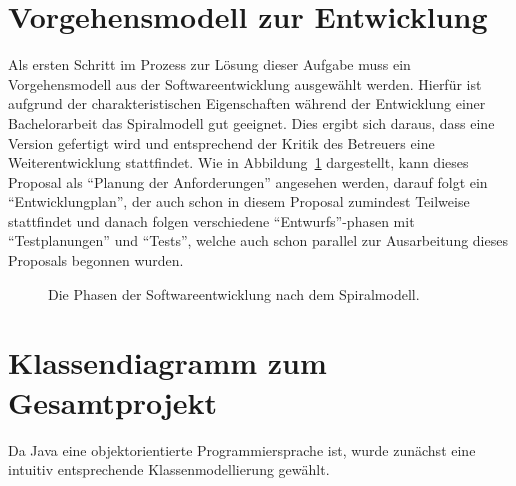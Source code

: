 \documentclass[
	12pt,
	halfparskip,
	a4paper,
	abstract,
	bibliography=totoc,
	liststotoc
]{scrreprt}
\begin{document}
\section{Vorgehensmodell zur Entwicklung}

Als ersten Schritt im Prozess zur Lösung dieser Aufgabe muss ein Vorgehensmodell aus der Softwareentwicklung ausgewählt werden. Hierfür ist aufgrund der charakteristischen Eigenschaften während der Entwicklung einer Bachelorarbeit das Spiralmodell gut geeignet. Dies ergibt sich daraus, dass eine Version gefertigt wird und entsprechend der Kritik des Betreuers eine Weiterentwicklung stattfindet. Wie in Abbildung~\ref{fig:spiralmodell} dargestellt, kann dieses Proposal als “Planung der Anforderungen” angesehen werden, darauf folgt ein “Entwicklungplan”, der auch schon in diesem Proposal zumindest Teilweise stattfindet und danach folgen verschiedene “Entwurfs”-phasen mit “Testplanungen” und “Tests”, welche auch schon parallel zur Ausarbeitung dieses Proposals begonnen wurden. \citep{spiral}

\begin{figure}[htb]
\begin{center}
\end{center}
\caption{Die Phasen der Softwareentwicklung nach dem Spiralmodell. \citep{conny}}
\label{fig:spiralmodell}
\end{figure}

\section{Klassendiagramm zum Gesamtprojekt}

Da Java eine objektorientierte Programmiersprache ist, wurde zunächst eine intuitiv entsprechende Klassenmodellierung gewählt.
\end{document}
